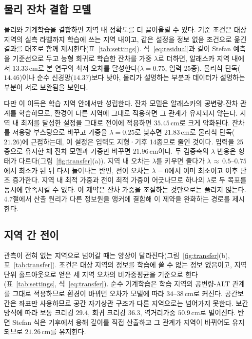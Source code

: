 \documentclass[10pt,twocolumn]{article}
\begin{document}
\subsection{물리 잔차 결합 모델}
물리와 기계학습을 결합하면 지역 내 정확도를 더 끌어올릴 수 있다. 기준 조건은 대상 지역의 실측 라벨까지 학습에 쓰는 지역 내이고, 같은 설정을 정보 없음 조건으로 옮긴 결과를 대조로 함께 제시한다(표~\ref{tab:settings}). 식~\eqref{eq:residual}과 같이 Stefan 예측을 기준선으로 두고 능형 회귀로 학습한 잔차를 가중 $\lambda$로 더하면, 알래스카 지역 내에서 $13.33\,\mathrm{cm}$로 본 연구의 최저 오차를 달성한다($\lambda{=}0.75$, 입력 25종). 물리식 단독($14.46$)이나 순수 신경망($14.37$)보다 낮아, 물리가 설명하는 부분과 데이터가 설명하는 부분이 서로 보완됨을 보인다.


다만 이 이득은 학습 지역 안에서만 성립한다. 잔차 모델은 알래스카의 공변량-잔차 관계를 학습하므로, 환경이 다른 지역에 그대로 적용하면 그 관계가 유지되지 않는다. 지역 내 최저를 달성한 설정을 그대로 전이에 적용하면 $35.45\,\mathrm{cm}$로 크게 악화된다. 잔차를 저용량 부스팅으로 바꾸고 가중을 $\lambda{=}0.25$로 낮추면 $21.83\,\mathrm{cm}$로 물리식 단독($21.26$)에 근접하는데, 이 설정은 입력도 지형·기후 14종으로 줄인 것이다. 입력을 25종으로 유지한 채 잔차 모델과 가중만 바꾸면 $21.96\,\mathrm{cm}$이다. 두 검증축의 $\lambda$ 반응은 형태가 다르다(그림~\ref{fig:transfer}(a)). 지역 내 오차는 $\lambda$를 키우면 줄다가 $\lambda\,{\approx}\,0.5\text{--}0.75$에서 최소가 된 뒤 다시 늘어나는 반면, 전이 오차는 $\lambda{=}0$에서 이미 최소이고 이후 단조 증가한다. 지역 내 최적 가중과 전이 최적 가중이 어긋나므로 하나의 $\lambda$로 두 목표를 동시에 만족시킬 수 없다. 이 제약은 잔차 가중을 조절하는 것만으로는 풀리지 않는다. 4.7절에서 산출 원리가 다른 정보원을 앵커에 결합해 이 제약을 완화하는 경로를 제시한다.

\subsection{지역 간 전이}
관측이 전혀 없는 지역으로 넘어갈 때는 양상이 달라진다(그림~\ref{fig:transfer}(b), 표~\ref{tab:transfer}). 조건은 대상 지역의 정보를 학습에 쓸 수 없는 정보 없음이고, 지역 단위 홀드아웃으로 얻은 세 지역 오차의 비가중평균을 기준으로 한다(표~\ref{tab:settings}, 식~\eqref{eq:transfer}). 순수 기계학습은 학습 지역의 공변량-ALT 관계를 그대로 적용하므로 환경이 바뀌면 오차가 모델에 따라 $34\text{--}38\,\mathrm{cm}$로 커진다. 공간보간은 좌표만 사용하므로 공간 자기상관 구조가 다른 지역으로는 넘어가지 못한다. 보간 방식에 따라 보통 크리깅 $29.4$, 회귀 크리깅 $36.3$, 역거리가중 $50.9\,\mathrm{cm}$로 벌어진다. 반면 Stefan 식은 기후에서 융해 깊이를 직접 산출하고 그 관계가 지역이 바뀌어도 유지되므로 $21.26\,\mathrm{cm}$를 유지한다.
\end{document}
